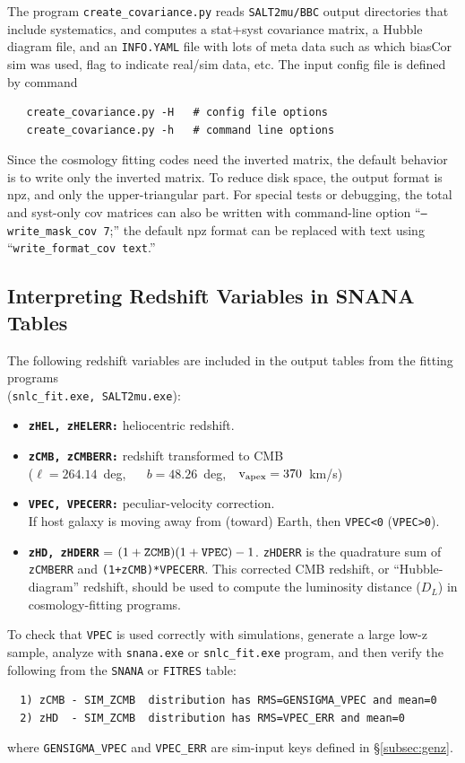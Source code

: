 \documentclass[12pt]{article}
\newcommand{\crcov}{{\tt create\_covariance.py}}
\begin{document}
The program {\crcov} reads {\tt SALT2mu/BBC} output directories that include
systematics, and computes a stat+syst covariance matrix, a Hubble diagram file,
and an {\tt INFO.YAML} file with lots of meta data such as which biasCor sim was used,
flag to indicate real/sim data, etc. The input config file is defined by command
\begin{verbatim}
   create_covariance.py -H   # config file options
   create_covariance.py -h   # command line options
\end{verbatim}
%
Since the cosmology fitting codes need the inverted matrix, the default
behavior is to write only the inverted matrix. To reduce disk space,
the output format is npz, and only the upper-triangular part. 
For special tests or debugging, the total and syst-only cov matrices
can also be written with command-line option ``{\tt --write\_mask\_cov 7};''
the default npz format can be replaced with text using
``{\tt write\_format\_cov text}.''


   \subsection{Interpreting Redshift Variables in SNANA Tables}
   \label{subsec:zdefine}

The following redshift variables are included in the output tables
from the fitting programs \\ ({\tt snlc\_fit.exe, SALT2mu.exe}):
\begin{itemize}
   \item {\bf\tt zHEL, zHELERR:} heliocentric redshift.
   \item {\bf\tt zCMB, zCMBERR:} redshift transformed to CMB  \\
      ($\ell=264.14$~deg, ~~ $b=48.26$~deg,~~${\rm v}_{\rm apex} = 370$~km/s)
   \item {\bf\tt VPEC, VPECERR:} peculiar-velocity correction.  \\
           If host galaxy is moving away from (toward) Earth, 
            then {\tt VPEC<0} ({\tt VPEC>0}).
   \item {\bf\tt zHD, zHDERR} = $(1+{\rm\tt ZCMB})(1+{\rm\tt VPEC}) - 1$. 
         {\tt zHDERR} is the quadrature sum of {\tt zCMBERR} and 
           {\tt (1+zCMB)*VPECERR}.
         This corrected CMB redshift, or ``Hubble-diagram'' redshift, 
         should be used to compute the 
         luminosity distance ($D_L$) in cosmology-fitting programs.
\end{itemize} 
%
To check that {\tt VPEC} is used correctly with simulations,
generate a large low-z sample, analyze with {\tt snana.exe} or
{\tt snlc\_fit.exe} program, and then verify the following from
the {\tt SNANA} or {\tt FITRES} table:
\begin{verbatim}
  1) zCMB - SIM_ZCMB  distribution has RMS=GENSIGMA_VPEC and mean=0
  2) zHD  - SIM_ZCMB  distribution has RMS=VPEC_ERR and mean=0
\end{verbatim}
%
where  {\tt GENSIGMA\_VPEC} and {\tt VPEC\_ERR} are sim-input
keys defined in  \S\ref{subsec:genz}.
\end{document}
